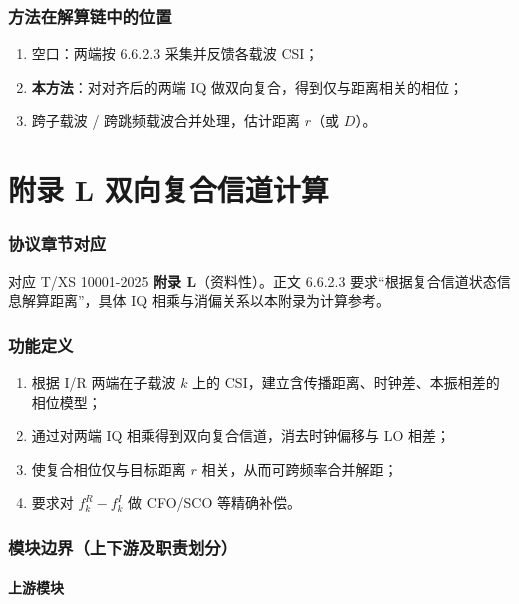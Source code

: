 \documentclass[11pt,a4paper]{ctexart}
\begin{document}
\section{方法在解算链中的位置}

\begin{enumerate}[nosep]
  \item 空口：两端按 6.6.2.3 采集并反馈各载波 CSI；
  \item \textbf{本方法}：对对齐后的两端 IQ 做双向复合，得到仅与距离相关的相位；
  \item 跨子载波 / 跨跳频载波合并处理，估计距离 $r$（或 $D$）。
\end{enumerate}

\newpage
\part{附录 L 双向复合信道计算}

\section{协议章节对应}

对应 T/XS 10001-2025 \textbf{附录 L}（资料性）。正文 6.6.2.3 要求``根据复合信道状态信息解算距离''，具体 IQ 相乘与消偏关系以本附录为计算参考。

\section{功能定义}

\begin{enumerate}[nosep]
  \item 根据 I/R 两端在子载波 $k$ 上的 CSI，建立含传播距离、时钟差、本振相差的相位模型；
  \item 通过对两端 IQ 相乘得到双向复合信道，消去时钟偏移与 LO 相差；
  \item 使复合相位仅与目标距离 $r$ 相关，从而可跨频率合并解距；
  \item 要求对 $f_k^{R}-f_k^{I}$ 做 CFO/SCO 等精确补偿。
\end{enumerate}

\section{模块边界（上下游及职责划分）}

\subsection{上游模块}
\end{document}
